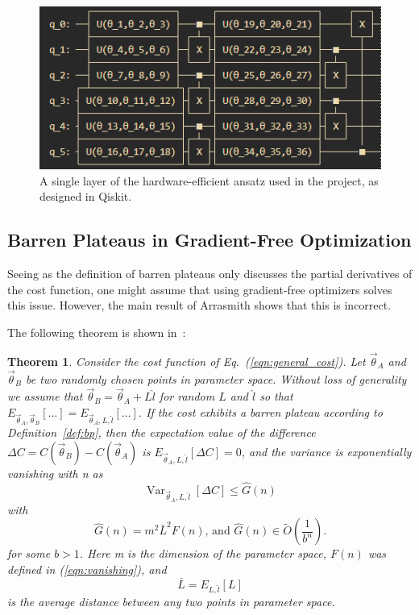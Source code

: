 \documentclass[a4paper,12pt]{article}
\newcommand{\thetas}{\vec{\theta}}
\DeclareMathOperator{\Var}{Var}
\newtheorem{theorem}{Theorem}
\begin{document}
\begin{figure}[h]
    \centering
    \captionsetup{justification=centering, margin=0.5cm}
    \includegraphics{arrasmith_layer.png}
    \caption{A single layer of the hardware-efficient ansatz used in the project, as designed in Qiskit.}
    \label{fig:layer}
\end{figure}

\subsection{Barren Plateaus in Gradient-Free Optimization}
Seeing as the definition of barren plateaus only discusses the partial derivatives of the cost function, one might assume that using gradient-free optimizers solves this issue.
However, the main result of Arrasmith shows that this is incorrect.

The following theorem is shown in~\cite{arrasmith_effect_2021}:

\begin{theorem}
    Consider the cost function of Eq.~(\ref{eqn:general_cost}). Let ${\thetas}_A$ and $\thetas_B$ be two randomly chosen points in parameter space.
    Without loss of generality we assume that $\thetas_B = \thetas_A + L\hat{l}$ for random $L$ and $\hat{l}$ so that $E_{\thetas_A, \thetas_B}[\dots] = E_{\thetas_A, L, \hat{l}}[\dots]$.
    If the cost exhibits a barren plateau according to Definition~\ref{def:bp}, then the expectation value of the difference $\Delta C = C(\thetas_B) - C(\thetas_A)$ is $E_{\thetas_A, L, \hat{l}}[\Delta C] = 0$, and the variance is exponentially vanishing with n as 
    \begin{equation}
        \Var_{\thetas_A,L,\hat{l}}[\Delta C] \leq \hat{G}(n)
    \end{equation}
    with
    \begin{equation}
        \hat{G}(n) = m^2 \bar{L}^2 F(n)\textrm{,    and     } \hat{G}(n) \in \tilde{O}\left(\frac{1}{b^n}\right).
    \end{equation}
    for some $b>1$. Here m is the dimension of the parameter space, $F(n)$ was defined in (\ref{eqn:vanishing}), and
    \begin{equation}
        \bar{L} = E_{L,\hat{l}}[L]
    \end{equation}
    is the average distance between any two points in parameter space.
\end{theorem}
\end{document}
